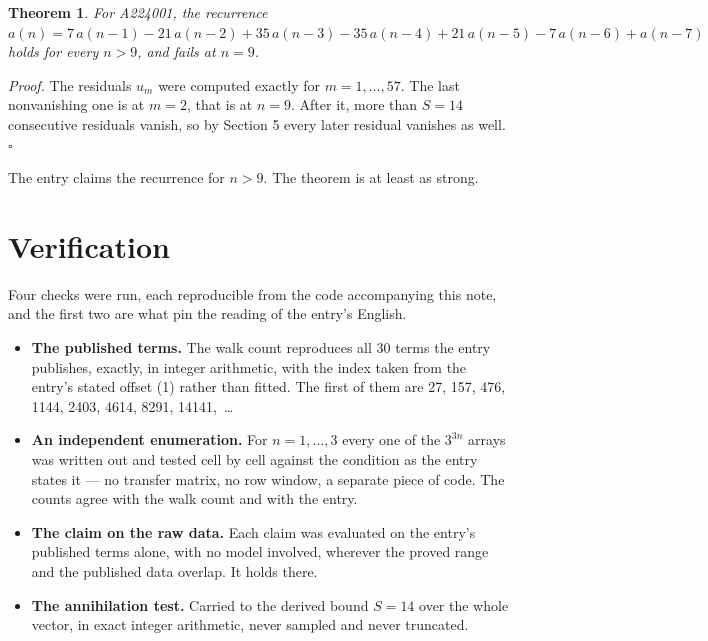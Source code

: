 \documentclass[11pt]{article}
\newtheorem{theorem}{Theorem}
\theoremstyle{definition}
\begin{document}
\begin{theorem} For A224001, the recurrence $a(n) = 7\,a(n-1) - 21\,a(n-2) + 35\,a(n-3) - 35\,a(n-4) + 21\,a(n-5) - 7\,a(n-6) + a(n-7)$ holds for every $n > 9$, and fails at $n = 9$.\end{theorem}

{\itshape Proof.} The residuals $u_m$ were computed exactly for $m = 1,\dots,57$. The last nonvanishing one is at $m = 2$, that is at $n = 9$. After it, more than $S = 14$ consecutive residuals vanish, so by Section 5 every later residual vanishes as well. $\square$

The entry claims the recurrence for $n > 9$. The theorem is at least as strong.

\section{Verification}

Four checks were run, each reproducible from the code accompanying this note, and the first two are what pin the reading of the entry's English.

\begin{itemize}

\item {\bfseries The published terms.} The walk count reproduces all 30 terms the entry publishes, exactly, in integer arithmetic, with the index taken from the entry's stated offset (1) rather than fitted. The first of them are 27, 157, 476, 1144, 2403, 4614, 8291, 14141,~\dots

\item {\bfseries An independent enumeration.} For $n = 1,\dots,3$ every one of the $3^{3n}$ arrays was written out and tested cell by cell against the condition as the entry states it --- no transfer matrix, no row window, a separate piece of code. The counts agree with the walk count and with the entry.

\item {\bfseries The claim on the raw data.} Each claim was evaluated on the entry's published terms alone, with no model involved, wherever the proved range and the published data overlap. It holds there.

\item {\bfseries The annihilation test.} Carried to the derived bound $S = 14$ over the whole vector, in exact integer arithmetic, never sampled and never truncated.

\end{itemize}
\end{document}

